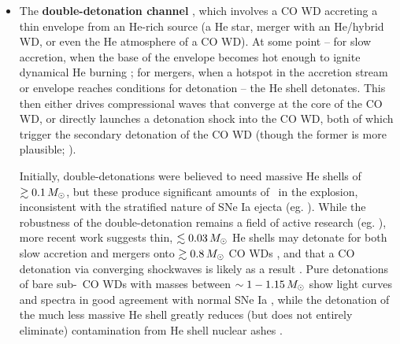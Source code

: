 \begin{itemize}


	\item The {\bf double-detonation channel} \citep{livn90, woosw94}, which involves a CO WD accreting a thin envelope from an He-rich source (a He star, merger with an He/hybrid WD, or even the He atmosphere of a CO WD).  At some point -- for slow accretion, when the base of the envelope becomes hot enough to ignite dynamical He burning \citep{woosk11}; for mergers, when a hotspot in the accretion stream or envelope reaches conditions for detonation \citep{guil+10, rask+12, pakm+13} -- the He shell detonates.  This then either drives compressional waves that converge at the core of the CO WD, or directly launches a detonation shock into the CO WD, both of which trigger the secondary detonation of the CO WD (though the former is more plausible; \citealt{mollw13}).  


Initially, double-detonations were believed to need massive He shells of $\gtrsim0.1\,\Msun$, but these produce significant amounts of \Ni\ in the explosion, inconsistent with the stratified nature of SNe Ia ejecta (eg. \citealt{krom+10,woosk11}).  While the robustness of the double-detonation remains a field of active research (eg. \citealt{woosk11, holc+13, shenm14, shenb14, dan+15}), more recent work suggests thin, $\lesssim0.03\,\Msun$ He shells may detonate for both slow accretion and mergers onto $\gtrsim0.8\,\Msun$ CO WDs \citep{woosk11, pakm+13, shenm14}, and that a CO detonation via converging shockwaves is likely as a result \citep{fink+10, mollw13, shenb14}.  Pure detonations of bare sub-\Mch\ CO WDs with masses between $\sim1-1.15\,\Msun$ show light curves and spectra in good agreement with normal SNe Ia \citep{shig+92, sim+10}, while the detonation of the much less massive He shell greatly reduces (but does not entirely eliminate) contamination from He shell nuclear ashes \citep{krom+10, hill+13}.



\end{itemize}
